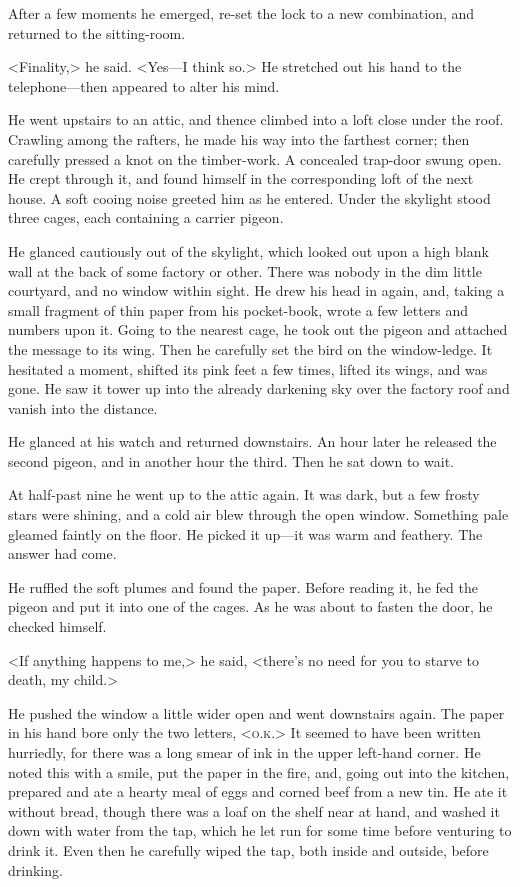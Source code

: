 After a few moments he emerged, re-set the lock to a new combination, and returned to the sitting-room.

<Finality,> he said. <Yes—I think so.> He stretched out his hand to the telephone—then appeared to alter his mind.

He went upstairs to an attic, and thence climbed into a loft close under the roof. Crawling among the rafters, he made his way into the farthest corner; then carefully pressed a knot on the timber-work. A concealed trap-door swung open. He crept through it, and found himself in the corresponding loft of the next house. A soft cooing noise greeted him as he entered. Under the skylight stood three cages, each containing a carrier pigeon.

He glanced cautiously out of the skylight, which looked out upon a high blank wall at the back of some factory or other. There was nobody in the dim little courtyard, and no window within sight. He drew his head in again, and, taking a small fragment of thin paper from his pocket-book, wrote a few letters and numbers upon it. Going to the nearest cage, he took out the pigeon and attached the message to its wing. Then he carefully set the bird on the window-ledge. It hesitated a moment, shifted its pink feet a few times, lifted its wings, and was gone. He saw it tower up into the already darkening sky over the factory roof and vanish into the distance.

He glanced at his watch and returned downstairs. An hour later he released the second pigeon, and in another hour the third. Then he sat down to wait.

At half-past nine he went up to the attic again. It was dark, but a few frosty stars were shining, and a cold air blew through the open window. Something pale gleamed faintly on the floor. He picked it up—it was warm and feathery. The answer had come.

He ruffled the soft plumes and found the paper. Before reading it, he fed the pigeon and put it into one of the cages. As he was about to fasten the door, he checked himself.

<If anything happens to me,> he said, <there's no need for you to starve to death, my child.>

He pushed the window a little wider open and went downstairs again. The paper in his hand bore only the two letters, <\textsc{o.k.}> It seemed to have been written hurriedly, for there was a long smear of ink in the upper left-hand corner. He noted this with a smile, put the paper in the fire, and, going out into the kitchen, prepared and ate a hearty meal of eggs and corned beef from a new tin. He ate it without bread, though there was a loaf on the shelf near at hand, and washed it down with water from the tap, which he let run for some time before venturing to drink it. Even then he carefully wiped the tap, both inside and outside, before drinking.

